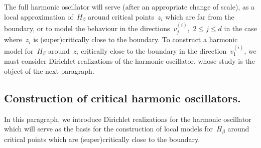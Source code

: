 \documentclass[10pt]{article}
\newcommand{\1}{\mathbbm 1}
\newcommand{\hessEigvec}[2]{v^{(#1)}_{#2}} %
\begin{document}
    The full harmonic oscillator will serve (after an appropriate change of scale), as a local approximation of~$H_\beta$ around critical points~$z_i$ which are far from the boundary, or to model the behaviour in the directions~$\hessEigvec{i}{j}$,~$2\leq j \leq d$ in the case where~$z_i$ is (super)critically close to the boundary.
    To construct a harmonic model for~$H_\beta$ around~$z_i$ critically close to the boundary in the direction~$\hessEigvec{i}{1}$, we must consider Dirichlet realizations of the harmonic oscillator, whose study is the object of the next paragraph.
    \subsection{Construction of critical harmonic oscillators.}\label{subsec:critical_oscillators}
    In this paragraph, we introduce Dirichlet realizations for the harmonic oscillator which will serve as the basis for the construction of local models for~$H_\beta$ around critical points which are (super)critically close to the boundary.
\end{document}
